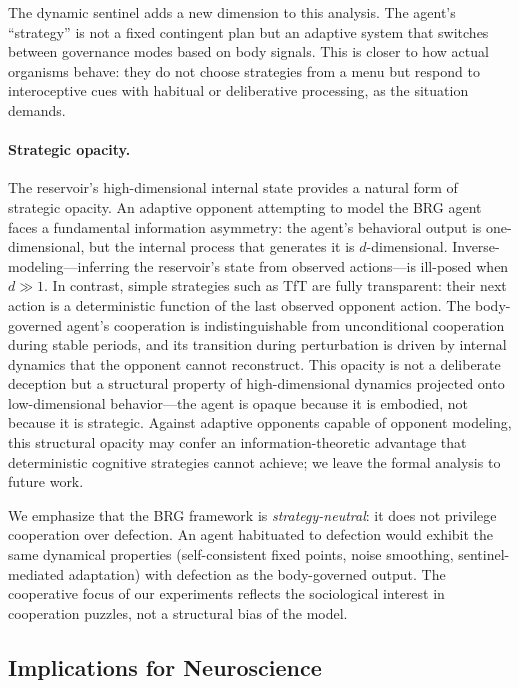 \documentclass[11pt,a4paper]{article}
\theoremstyle{definition}
\begin{document}
The dynamic sentinel adds a new dimension to this analysis.  The agent's
``strategy'' is not a fixed contingent plan but an adaptive system that
switches between governance modes based on body signals.  This is closer
to how actual organisms behave: they do not choose strategies from a menu
but respond to interoceptive cues with habitual or deliberative processing,
as the situation demands.

\paragraph{Strategic opacity.}
The reservoir's high-dimensional internal state provides a natural form
of strategic opacity.  An adaptive opponent attempting to model the BRG
agent faces a fundamental information asymmetry: the agent's behavioral
output is one-dimensional, but the internal process that generates it is
$d$-dimensional.  Inverse-modeling---inferring the reservoir's state from
observed actions---is ill-posed when $d \gg 1$.  In contrast, simple
strategies such as TfT are fully transparent: their next action is a
deterministic function of the last observed opponent action.  The
body-governed agent's cooperation is indistinguishable from unconditional
cooperation during stable periods, and its transition during perturbation
is driven by internal dynamics that the opponent cannot reconstruct.  This
opacity is not a deliberate deception but a structural property of
high-dimensional dynamics projected onto low-dimensional behavior---the
agent is opaque because it is embodied, not because it is strategic.
Against adaptive opponents capable of opponent modeling, this structural
opacity may confer an information-theoretic advantage that deterministic
cognitive strategies cannot achieve; we leave the formal analysis to
future work.

We emphasize that the BRG framework is \emph{strategy-neutral}: it does
not privilege cooperation over defection.  An agent habituated to defection
would exhibit the same dynamical properties (self-consistent fixed points,
noise smoothing, sentinel-mediated adaptation) with defection as the
body-governed output.  The cooperative focus of our experiments reflects
the sociological interest in cooperation puzzles, not a structural bias
of the model.

\subsection{Implications for Neuroscience}
\end{document}
